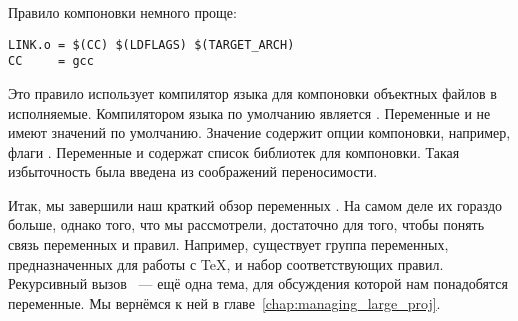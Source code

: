 Правило компоновки немного проще:

{\footnotesize
\begin{verbatim}
LINK.o = $(CC) $(LDFLAGS) $(TARGET_ARCH)
CC     = gcc
\end{verbatim}
}

Это правило использует компилятор языка \Clang{} для компоновки
объектных файлов в исполняемые. Компилятором языка \Clang{} по
умолчанию является . Переменные  и
 не имеют значений по умолчанию. Значение
 содержит опции компоновки, например, флаги
. Переменные  и 
содержат список библиотек для компоновки. Такая избыточность была
введена из соображений переносимости.

Итак, мы завершили наш краткий обзор переменных \GNUmake{}. На самом
деле их гораздо больше, однако того, что мы рассмотрели, достаточно
для того, чтобы понять связь переменных и правил. Например, существует
группа переменных, предназначенных для работы с \TeX{}, и набор
соответствующих правил. Рекурсивный вызов \GNUmake{}~--- ещё одна
тема, для обсуждения которой нам понадобятся переменные. Мы вернёмся к
ней в главе~\ref{chap:managing_large_proj}.
